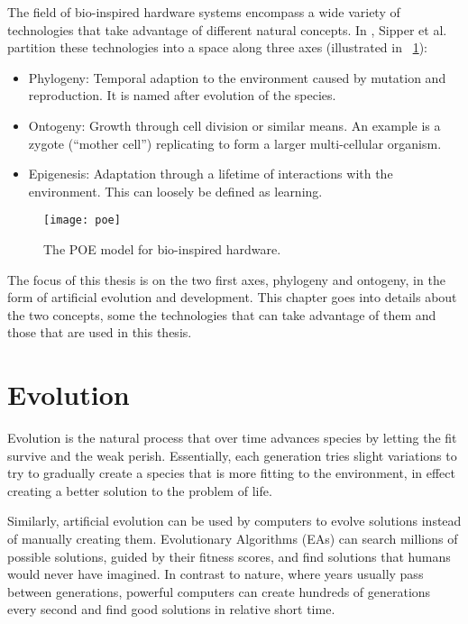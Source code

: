 The field of bio-inspired hardware systems encompass a wide variety of technologies that take advantage of different natural concepts.
In \cite{sipper1997poe}, Sipper et al. partition these technologies into a space along three axes (illustrated in \figurename~\ref{fig:poe}):

\begin{itemize}
    \item
    Phylogeny:
    Temporal adaption to the environment caused by mutation and reproduction.
    It is named after evolution of the species.
    \item
    Ontogeny:
    Growth through cell division or similar means.
    An example is a zygote (``mother cell'') replicating to form a larger multi-cellular organism.
    \item
    Epigenesis:
    Adaptation through a lifetime of interactions with the environment.
    This can loosely be defined as learning.
\end{itemize}

\begin{figure}[!ht]
    \centering
    \texttt{[image: poe]}
    \caption[POE model]{
        The POE model for bio-inspired hardware.
    }
    \label{fig:poe}
\end{figure}

The focus of this thesis is on the two first axes, phylogeny and ontogeny, in the form of artificial evolution and development.
This chapter goes into details about the two concepts, some the technologies that can take advantage of them and those that are used in this thesis.


\section{Evolution}

Evolution is the natural process that over time advances species by letting the fit survive and the weak perish.
Essentially, each generation tries slight variations to try to gradually create a species that is more fitting to the environment, in effect creating a better solution to the problem of life.

Similarly, artificial evolution can be used by computers to evolve solutions instead of manually creating them.
Evolutionary Algorithms (EAs) can search millions of possible solutions, guided by their fitness scores, and find solutions that humans would never have imagined.
In contrast to nature, where years usually pass between generations, powerful computers can create hundreds of generations every second and find good solutions in relative short time.

